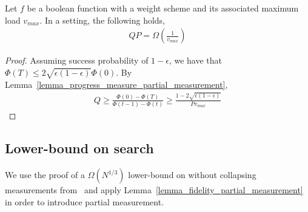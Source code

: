     \begin{lemma}\label{lemma_weighted_adversary_partial_measurement}
        Let $f$ be a boolean function with a weight scheme and its associated maximum load $v_{max}$. In a \pdqpname setting, the following holds,
        \begin{align*}
            QP = \Omega\left(\frac{1}{v_{max}}\right)
        \end{align*}
    \end{lemma}
    \begin{proof}
        Assuming success probability of $1-\epsilon$, we have that $\Phi(T) \leq 2\sqrt{\epsilon (1-\epsilon)} \Phi(0)$. By Lemma~\ref{lemma_progress_measure_partial_measurement},
        \begin{align*}
            Q\geq \frac{\Phi(0)-\Phi(T)}{\Phi(t-1)-\Phi(t)} \geq \frac{1-2\sqrt{\epsilon(1-\epsilon)}}{P v_{max}}
        \end{align*}
\end{proof}

\subsection{Lower-bound on search}

We use the proof of a $\Omega(N^{1/3})$ lower-bound on \pdqpname without collapsing measurements from~\cite{space_above_bqp} and apply Lemma~\ref{lemma_fidelity_partial_measurement} in order to introduce partial measurement.

